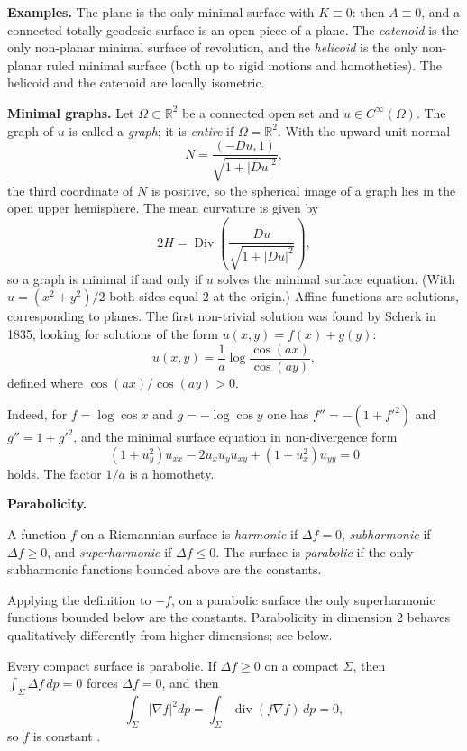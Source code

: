 \medskip\noindent
{\bf Examples.}
The plane is the only minimal surface with
$K\equiv 0$: then $A\equiv 0$, and a
connected totally geodesic surface is an
open piece of a plane. The
\emph{catenoid} is the only non-planar
minimal surface of revolution, and the
\emph{helicoid} is the only non-planar
ruled minimal surface (both up to rigid
motions and homotheties). The helicoid and
the catenoid are locally isometric.

\medskip\noindent
{\bf Minimal graphs.}
Let $\Omega\subset\mathbb{R}^2$ be a
connected open set and
$u\in C^\infty(\Omega)$. The graph of $u$
is called a \emph{graph}; it is
\emph{entire} if $\Omega=\mathbb{R}^2$.
With the upward unit normal
$$
N=\frac{(-Du,1)}{\sqrt{1+|Du|^2}},
$$
the third coordinate of $N$ is positive,
so the spherical image of a graph lies in
the open upper hemisphere. The mean
curvature is given by
$$
2H=\operatorname{Div}\left(
\frac{Du}{\sqrt{1+|Du|^2}}
\right),
$$
so a graph is minimal if and only if $u$
solves the minimal surface equation.
(With $u=(x^2+y^2)/2$ both sides equal
$2$ at the origin.) Affine functions are
solutions, corresponding to planes. The
first non-trivial solution was found by
Scherk in 1835, looking for solutions of
the form $u(x,y)=f(x)+g(y)$:
$$
u(x,y)=\frac{1}{a}\log
\frac{\cos(ax)}{\cos(ay)},
$$
defined where
$\cos(ax)/\cos(ay)>0$.

Indeed, for $f=\log\cos x$ and
$g=-\log\cos y$ one has
$f''=-(1+f'^2)$ and $g''=1+g'^2$, and the
minimal surface equation in
non-divergence form
$$
(1+u_y^2)u_{xx}-2u_xu_yu_{xy}
+(1+u_x^2)u_{yy}=0
$$
holds. The factor $1/a$ is a homothety.

\medskip\noindent
{\bf Parabolicity.}

\begin{definition}
\label{definition-alias-parabolic}
A function $f$ on a Riemannian surface is
\emph{harmonic} if $\Delta f=0$,
\emph{subharmonic} if $\Delta f\geq 0$,
and \emph{superharmonic} if
$\Delta f\leq 0$. The surface is
\emph{parabolic} if the only subharmonic
functions bounded above are the
constants.
\end{definition}

Applying the definition to $-f$, on a
parabolic surface the only superharmonic
functions bounded below are the
constants. Parabolicity in dimension 2
behaves qualitatively differently from
higher dimensions; see below.

Every compact surface is parabolic. If
$\Delta f\geq 0$ on a compact $\Sigma$,
then $\int_\Sigma\Delta f\,dp=0$ forces
$\Delta f=0$, and then
$$
\int_\Sigma|\nabla f|^2dp
=\int_\Sigma\operatorname{div}(f\nabla f)
\,dp=0,
$$
so $f$ is constant
\cite[Lemma 5.2, p.~46]{alias2006analisis}.

